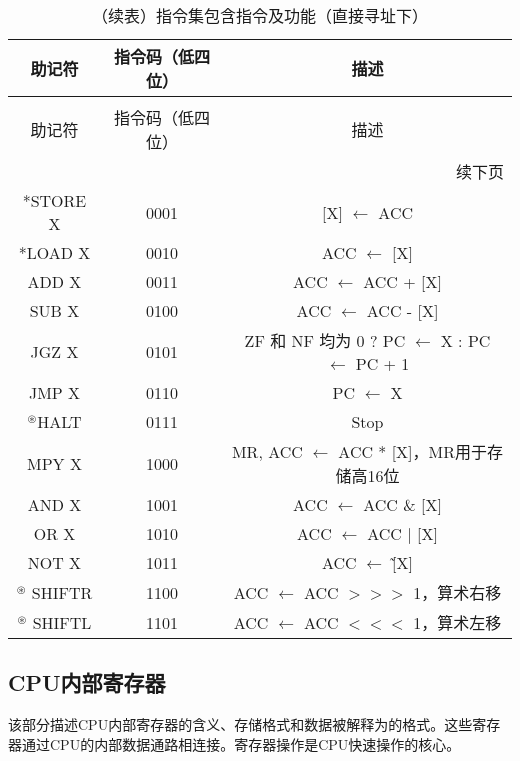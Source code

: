 \documentclass[lang=cn,a4paper,newtx]{elegantpaper}
\begin{document}
\begin{longtable}{c c c}
  \caption{指令集包含指令及功能（直接寻址下）} \label{tab:ISA:instructions} \\
  \toprule
  助记符  & 指令码（低四位） & 描述 \\
  \midrule
  \endfirsthead
  
  \caption[]{（续表）指令集包含指令及功能（直接寻址下）} \\
  \toprule
  助记符  & 指令码（低四位） & 描述 \\
  \midrule
  \endhead
  
  \midrule
  \multicolumn{3}{r}{续下页} \\
  \midrule
  \endfoot
  
  \bottomrule
  \endlastfoot
  
  *STORE X &  0001   & [X] $\leftarrow$ ACC  \\
  *LOAD X  & 0010    & ACC $\leftarrow$ [X]  \\
  ADD X   & 0011    & ACC $\leftarrow$ ACC + [X]\\
  SUB X   & 0100  & ACC $\leftarrow$ ACC - [X]\\
  JGZ X   & 0101    & ZF 和 NF 均为 0   ? PC $\leftarrow$ X : PC $\leftarrow$ PC + 1\\
  JMP X   & 0110    & PC $\leftarrow$ X\\
  $^\circledast$HALT    & 0111    & Stop\\
  MPY X   & 1000    & MR, ACC $\leftarrow$ ACC * [X]，MR用于存储高16位 \\
  AND X   & 1001    & ACC $\leftarrow$ ACC \& [X]\\
  OR X    & 1010    & ACC $\leftarrow$ ACC | [X]\\
  NOT X   & 1011    & ACC $\leftarrow$ \~[X] \\
  $^\circledast$ SHIFTR  & 1100    & ACC $\leftarrow$ ACC $>>>$ 1，算术右移\\
  $^\circledast$ SHIFTL  & 1101    & ACC $\leftarrow$ ACC $<<<$ 1，算术左移\\
\end{longtable}

\subsection{CPU内部寄存器}
该部分描述CPU内部寄存器的含义、存储格式和数据被解释为的格式。这些寄存器通过CPU的内部数据通路相连接。寄存器操作是CPU快速操作的核心。
\end{document}
